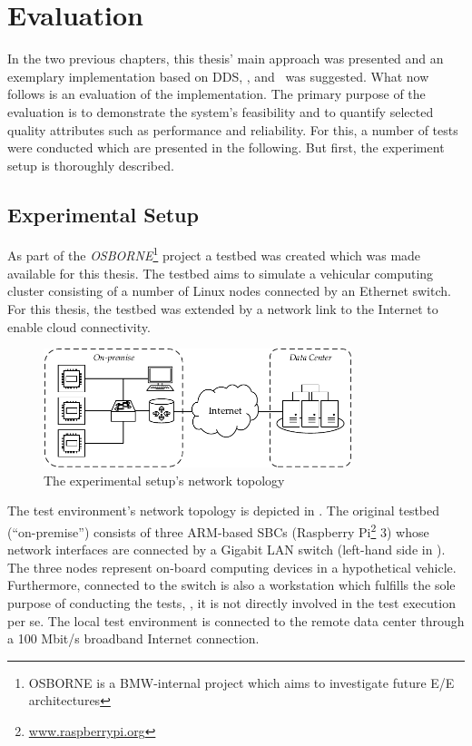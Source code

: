 \chapter{Evaluation}\label{chapter:evaluation}
In the two previous chapters, this thesis' main approach was presented and an exemplary implementation based on DDS, \wnet , and \docker\ was suggested. What now follows is an evaluation of the implementation. The primary purpose of the evaluation is to demonstrate the system's feasibility and to quantify selected quality attributes such as performance and reliability. For this, a number of tests were conducted which are presented in the following. But first, the experiment setup is thoroughly described.


\section{Experimental Setup}\label{sec:testsetup}

As part of the \emph{OSBORNE}\footnote{OSBORNE is a BMW-internal project which aims to investigate future E/E architectures} project a testbed was created which was made available for this thesis. The testbed aims to simulate a vehicular computing cluster consisting of a number of Linux nodes connected by an Ethernet switch. For this thesis, the testbed was extended by a network link to the Internet to enable cloud connectivity.

\begin{figure}[htpb]
  \centering
  \includegraphics[width=0.8\textwidth]{figures/network-setup}
  \caption[Network topology of the experimental setup]{The experimental setup's network topology}\label{fig:network-topology}
\end{figure}
The test environment's network topology is depicted in . The original testbed (``on-premise'') consists of three ARM-based SBCs (Raspberry Pi\footnote{\url{www.raspberrypi.org}} 3) whose network interfaces are connected by a Gigabit LAN switch (left-hand side in ). The three nodes represent on-board computing devices in a hypothetical vehicle. Furthermore, connected to the switch is also a workstation which fulfills the sole purpose of conducting the tests, \ie , it is not directly involved in the test execution per se. The local test environment is connected to the remote data center through a 100 Mbit/s broadband Internet connection.

